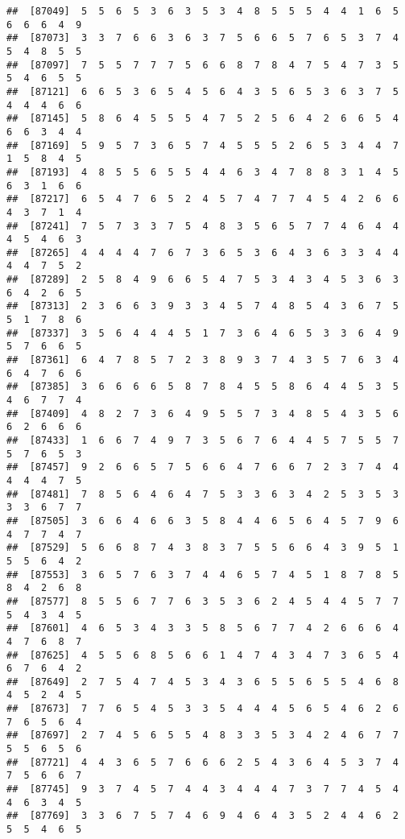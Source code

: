 \documentclass[
]{book}
\begin{document}
\begin{verbatim}
##  [87049]  5  5  6  5  3  6  3  5  3  4  8  5  5  5  4  4  1  6  5  6  6  6  4  9
##  [87073]  3  3  7  6  6  3  6  3  7  5  6  6  5  7  6  5  3  7  4  5  4  8  5  5
##  [87097]  7  5  5  7  7  7  5  6  6  8  7  8  4  7  5  4  7  3  5  5  4  6  5  5
##  [87121]  6  6  5  3  6  5  4  5  6  4  3  5  6  5  3  6  3  7  5  4  4  4  6  6
##  [87145]  5  8  6  4  5  5  5  4  7  5  2  5  6  4  2  6  6  5  4  6  6  3  4  4
##  [87169]  5  9  5  7  3  6  5  7  4  5  5  5  2  6  5  3  4  4  7  1  5  8  4  5
##  [87193]  4  8  5  5  6  5  5  4  4  6  3  4  7  8  8  3  1  4  5  6  3  1  6  6
##  [87217]  6  5  4  7  6  5  2  4  5  7  4  7  7  4  5  4  2  6  6  4  3  7  1  4
##  [87241]  7  5  7  3  3  7  5  4  8  3  5  6  5  7  7  4  6  4  4  4  5  4  6  3
##  [87265]  4  4  4  4  7  6  7  3  6  5  3  6  4  3  6  3  3  4  4  4  4  7  5  2
##  [87289]  2  5  8  4  9  6  6  5  4  7  5  3  4  3  4  5  3  6  3  6  4  2  6  5
##  [87313]  2  3  6  6  3  9  3  3  4  5  7  4  8  5  4  3  6  7  5  5  1  7  8  6
##  [87337]  3  5  6  4  4  4  5  1  7  3  6  4  6  5  3  3  6  4  9  5  7  6  6  5
##  [87361]  6  4  7  8  5  7  2  3  8  9  3  7  4  3  5  7  6  3  4  6  4  7  6  6
##  [87385]  3  6  6  6  6  5  8  7  8  4  5  5  8  6  4  4  5  3  5  4  6  7  7  4
##  [87409]  4  8  2  7  3  6  4  9  5  5  7  3  4  8  5  4  3  5  6  6  2  6  6  6
##  [87433]  1  6  6  7  4  9  7  3  5  6  7  6  4  4  5  7  5  5  7  5  7  6  5  3
##  [87457]  9  2  6  6  5  7  5  6  6  4  7  6  6  7  2  3  7  4  4  4  4  4  7  5
##  [87481]  7  8  5  6  4  6  4  7  5  3  3  6  3  4  2  5  3  5  3  3  3  6  7  7
##  [87505]  3  6  6  4  6  6  3  5  8  4  4  6  5  6  4  5  7  9  6  4  7  7  4  7
##  [87529]  5  6  6  8  7  4  3  8  3  7  5  5  6  6  4  3  9  5  1  5  5  6  4  2
##  [87553]  3  6  5  7  6  3  7  4  4  6  5  7  4  5  1  8  7  8  5  8  4  2  6  8
##  [87577]  8  5  5  6  7  7  6  3  5  3  6  2  4  5  4  4  5  7  7  5  4  3  4  5
##  [87601]  4  6  5  3  4  3  3  5  8  5  6  7  7  4  2  6  6  6  4  4  7  6  8  7
##  [87625]  4  5  5  6  8  5  6  6  1  4  7  4  3  4  7  3  6  5  4  6  7  6  4  2
##  [87649]  2  7  5  4  7  4  5  3  4  3  6  5  5  6  5  5  4  6  8  4  5  2  4  5
##  [87673]  7  7  6  5  4  5  3  3  5  4  4  4  5  6  5  4  6  2  6  7  6  5  6  4
##  [87697]  2  7  4  5  6  5  5  4  8  3  3  5  3  4  2  4  6  7  7  5  5  6  5  6
##  [87721]  4  4  3  6  5  7  6  6  6  2  5  4  3  6  4  5  3  7  4  7  5  6  6  7
##  [87745]  9  3  7  4  5  7  4  4  3  4  4  4  7  3  7  7  4  5  4  4  6  3  4  5
##  [87769]  3  3  6  7  5  7  4  6  9  4  6  4  3  5  2  4  4  6  2  5  5  4  6  5

\end{verbatim}
\end{document}
